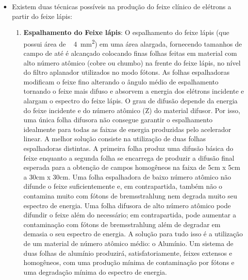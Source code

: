 \documentclass[11pt,a4paper]{article}
\begin{document}
                    \begin{itemize}
                        
                        \item Existem duas técnicas possíveis na produção do feixe clínico de elétrons a partir do feixe lápis:
                        
                            \begin{enumerate}
                                \item \textbf{Espalhamento do Feixe lápis}: O espalhamento do feixe lápis (que possui área de ~ \qty{4}{mm^2})  em uma área alargada, fornecendo tamanhos de campo de até  é alcançado colocando finas folhas feitas em material com alto número atômico (cobre ou chumbo) na frente do feixe lápis, no nível do filtro aplanador utilizados no modo fótons. As folhas espalhadoras modificam o feixe fino alterando o ângulo médio de espalhamento tornando o feixe mais difuso e absorvem a energia dos elétrons incidente e alargam o espectro do feixe lápis. O grau de difusão depende da energia do feixe incidente e do número atômico (Z) do material difusor. Por isso, uma única folha difusora não consegue garantir o espalhamento idealmente para todas as faixas de energia produzidas pelo acelerador linear. A melhor solução consiste na utilização de duas folhas espalhadoras distintas. A primeira folha produz uma difusão básica do feixe enquanto a segunda folha se encarrega de produzir a difusão final esperada para a obtenção de campos homogêneos na faixa de 5cm x 5cm a 30cm x 30cm. Uma folha espalhadora de baixo número atômico não difunde o feixe suficientemente e, em contrapartida, também não o contamina muito com fótons de bremsstrahlung nem degrada muito seu espectro de energia. Uma folha difusora de alto número atômico pode difundir o feixe além do necessário; em contrapartida, pode aumentar a contaminação com fótons de bremsstrahlung além de degradar em demasia o seu espectro de energia. A solução para tudo isso é a utilização de um material de número atômico médio: o Alumínio. Um sistema de duas folhas de alumínio produzirá, satisfatoriamente, feixes extensos e homogêneos, com uma produção mínima de contaminação por fótons e uma degradação mínima do espectro de energia. 
                                


\end{enumerate}
\end{itemize}
\end{document}
